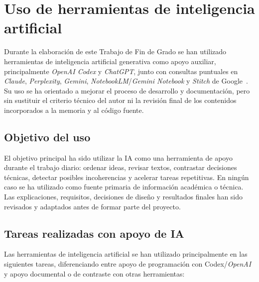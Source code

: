\chapter{Uso de herramientas de inteligencia artificial}\label{uso-ia}
\begin{refsection}
Durante la elaboración de este Trabajo de Fin de Grado se han utilizado herramientas de inteligencia artificial generativa como apoyo auxiliar, principalmente \textit{OpenAI Codex} y \textit{ChatGPT}, junto con consultas puntuales en \textit{Claude}, \textit{Perplexity}, \textit{Gemini}, \textit{NotebookLM}/\textit{Gemini Notebook} y \textit{Stitch} de Google~\cite{OpenAICodex,OpenAIChatGPT,AnthropicClaude,PerplexityAI,GoogleGemini,GoogleNotebookLM,GoogleStitch}. Su uso se ha orientado a mejorar el proceso de desarrollo y documentación, pero sin sustituir el criterio técnico del autor ni la revisión final de los contenidos incorporados a la memoria y al código fuente.

\section{Objetivo del uso}

El objetivo principal ha sido utilizar la IA como una herramienta de apoyo durante el trabajo diario: ordenar ideas, revisar textos, contrastar decisiones técnicas, detectar posibles incoherencias y acelerar tareas repetitivas. En ningún caso se ha utilizado como fuente primaria de información académica o técnica. Las explicaciones, requisitos, decisiones de diseño y resultados finales han sido revisados y adaptados antes de formar parte del proyecto.

\section{Tareas realizadas con apoyo de IA}

Las herramientas de inteligencia artificial se han utilizado principalmente en las siguientes tareas, diferenciando entre apoyo de programación con Codex/\textit{OpenAI} y apoyo documental o de contraste con otras herramientas:


\end{refsection}
